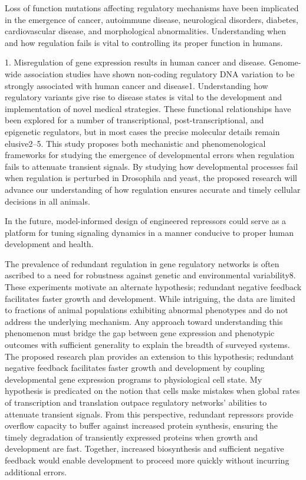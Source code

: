 Loss of function mutations affecting regulatory mechanisms have been implicated in the emergence of cancer, autoimmune disease, neurological disorders, diabetes, cardiovascular disease, and morphological abnormalities. Understanding when and how regulation fails is vital to controlling its proper function in humans.

1.	Misregulation of gene expression results in human cancer and disease. Genome-wide association studies have shown non-coding regulatory DNA variation to be strongly associated with human cancer and disease1. Understanding how regulatory variants give rise to disease states is vital to the development and implementation of novel medical strategies. These functional relationships have been explored for a number of transcriptional, post-transcriptional, and epigenetic regulators, but in most cases the precise molecular details remain elusive2–5. This study proposes both mechanistic and phenomenological frameworks for studying the emergence of developmental errors when regulation fails to attenuate transient signals. By studying how developmental processes fail when regulation is perturbed in Drosophila and yeast, the proposed research will advance our understanding of how regulation ensures accurate and timely cellular decisions in all animals.  

In the future, model-informed design of engineered repressors could serve as a platform for tuning signaling dynamics in a manner conducive to proper human development and health.

The prevalence of redundant regulation in gene regulatory networks is often ascribed to a need for robustness against genetic and environmental variability8. These experiments motivate an alternate hypothesis; redundant negative feedback facilitates faster growth and development. While intriguing, the data are limited to fractions of animal populations exhibiting abnormal phenotypes and do not address the underlying mechanism. Any approach toward understanding this phenomenon must bridge the gap between gene expression and phenotypic outcomes with sufficient generality to explain the breadth of surveyed systems. The proposed research plan provides an extension to this hypothesis; redundant negative feedback facilitates faster growth and development by coupling developmental gene expression programs to physiological cell state. My hypothesis is predicated on the notion that cells make mistakes when global rates of transcription and translation outpace regulatory networks’ abilities to attenuate transient signals. From this perspective, redundant repressors provide overflow capacity to buffer against increased protein synthesis, ensuring the timely degradation of transiently expressed proteins when growth and development are fast. Together, increased biosynthesis and sufficient negative feedback would enable development to proceed more quickly without incurring additional errors.

